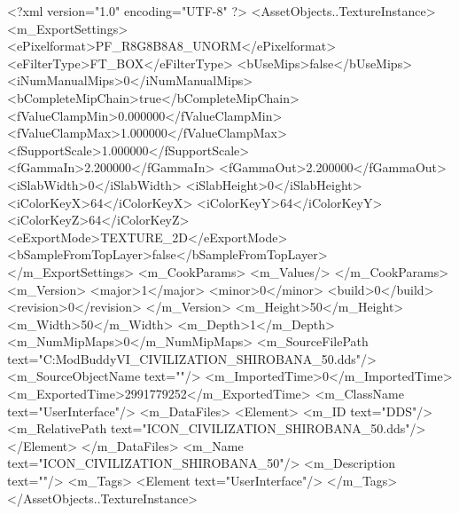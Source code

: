 <?xml version="1.0" encoding="UTF-8" ?>
<AssetObjects..TextureInstance>
	<m_ExportSettings>
		<ePixelformat>PF_R8G8B8A8_UNORM</ePixelformat>
		<eFilterType>FT_BOX</eFilterType>
		<bUseMips>false</bUseMips>
		<iNumManualMips>0</iNumManualMips>
		<bCompleteMipChain>true</bCompleteMipChain>
		<fValueClampMin>0.000000</fValueClampMin>
		<fValueClampMax>1.000000</fValueClampMax>
		<fSupportScale>1.000000</fSupportScale>
		<fGammaIn>2.200000</fGammaIn>
		<fGammaOut>2.200000</fGammaOut>
		<iSlabWidth>0</iSlabWidth>
		<iSlabHeight>0</iSlabHeight>
		<iColorKeyX>64</iColorKeyX>
		<iColorKeyY>64</iColorKeyY>
		<iColorKeyZ>64</iColorKeyZ>
		<eExportMode>TEXTURE_2D</eExportMode>
		<bSampleFromTopLayer>false</bSampleFromTopLayer>
	</m_ExportSettings>
	<m_CookParams>
		<m_Values/>
	</m_CookParams>
	<m_Version>
		<major>1</major>
		<minor>0</minor>
		<build>0</build>
		<revision>0</revision>
	</m_Version>
	<m_Height>50</m_Height>
	<m_Width>50</m_Width>
	<m_Depth>1</m_Depth>
	<m_NumMipMaps>0</m_NumMipMaps>
	<m_SourceFilePath text="C:\Users\asus\Documents\Firaxis ModBuddy\Civilization VI\temppic\ICON_CIVILIZATION_SHIROBANA_50.dds"/>
	<m_SourceObjectName text=""/>
	<m_ImportedTime>0</m_ImportedTime>
	<m_ExportedTime>2991779252</m_ExportedTime>
	<m_ClassName text="UserInterface"/>
	<m_DataFiles>
		<Element>
			<m_ID text="DDS"/>
			<m_RelativePath text="ICON_CIVILIZATION_SHIROBANA_50.dds"/>
		</Element>
	</m_DataFiles>
	<m_Name text="ICON_CIVILIZATION_SHIROBANA_50"/>
	<m_Description text=""/>
	<m_Tags>
		<Element text="UserInterface"/>
	</m_Tags>
</AssetObjects..TextureInstance>

